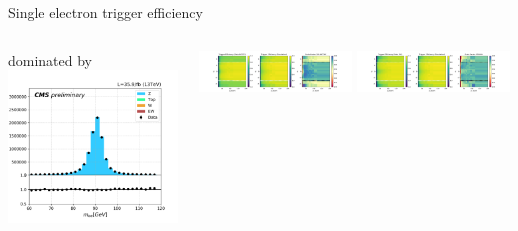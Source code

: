 \begin{frame}{Single electron trigger efficiency}
\begin{columns}
        \begin{block}{}
            \centering
            dominated by \zjets
            \includegraphics[width=\textwidth]{chapters/Analysis/sectionCalibration/figures/eTrigger/dileptonMass_tag30.png}
        \end{block}
        \begin{center}
            \includegraphics[width=0.49\textwidth, trim=24cm 0 3.7cm 0, clip]{chapters/Analysis/sectionCalibration/figures/eTrigger/eff2d_BCDEF.png}
            \includegraphics[width=0.49\textwidth, trim=24cm 0 3.7cm 0, clip]{chapters/Analysis/sectionCalibration/figures/eTrigger/eff2d_GH.png}
        \end{center}
    
    \end{columns}
    

\end{frame}



